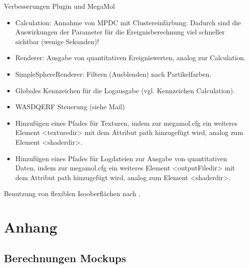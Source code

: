 Verbesserungen Plugin und MegaMol
\begin{itemize}
	\item Calculation: Annahme von MPDC mit Clustereinfärbung: Dadurch sind die Auswirkungen der Parameter für die Ereignisberechnung viel schneller sichtbar (wenige Sekunden)!
	\item Renderer: Ausgabe von quantitativen Ereigniswerten, analog zur Calculation.
	\item SimpleSphereRenderer: Filtern (Ausblenden) nach Partikelfarben.
	\item Globales Kennzeichen für die Logausgabe (vgl. Kennzeichen Calculation).
	\item WASDQERF Steuerung (siehe Mail)
	\item Hinzufügen eines Pfades für Texturen, indem zur megamol.cfg ein weiteres Element <texturedir> mit dem Attribut path hinzugefügt wird, analog zum Element <shaderdir>.
	\item Hinzufügen eines Pfades für Logdateien zur Ausgabe von quantitativen Daten, indem zur megamol.cfg ein weiteres Element <outputFiledir> mit dem Attribut path hinzugefügt wird, analog zum Element <shaderdir>.
\end{itemize}

Benutzung von flexiblen Isooberflächen nach \cite{carr2010flexibleIsosurfaces}.



\appendix

\chapter{Anhang}

\section{Berechnungen Mockups}\label{sec:mockups:berechnungen}

